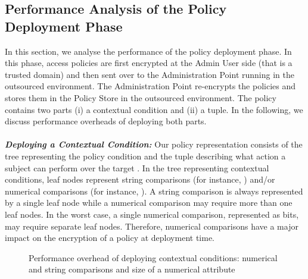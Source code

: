 \documentclass[epsfig,a4paper,11pt,titlepage]{book}
\numberwithin{algorithm}{chapter}
\begin{document}
\subsection{Performance Analysis of the Policy Deployment Phase}
\label{sec:espoon-policy-deployment}

In this section, we analyse the performance of the policy deployment phase. In this phase, access policies are first encrypted at the Admin User side (that is a trusted domain) and then sent over to the Administration Point running in the outsourced environment. The Administration Point re-encrypts the policies and stores them in the Policy Store in the outsourced environment. The policy contains two parts (i) a contextual condition and (ii) a  tuple. In the following, we discuss performance overheads of deploying both parts. \\ \\
\noindent \emph{\textbf{Deploying a Contextual Condition:}}
Our policy representation consists of the tree representing the policy condition and the  tuple describing what action  a subject  can perform over the target . In the tree representing contextual conditions, leaf nodes represent string comparisons (for instance, ) and/or numerical comparisons (for instance, ). A string comparison is always represented by a single leaf node while a numerical comparison may require more than one leaf nodes. In the worst case, a single numerical comparison, represented as  bits, may require  separate leaf nodes. Therefore, numerical comparisons have a major impact on the encryption of a policy at deployment time.

\begin{figure} [htp]
\centering
{}
\caption[Performance overhead of deploying contextual conditions]{Performance overhead of deploying contextual conditions:  numerical and string comparisons and  size of a numerical attribute}
\label{fig:erbac-policy-deployment-context}
\end{figure}
\end{document}
